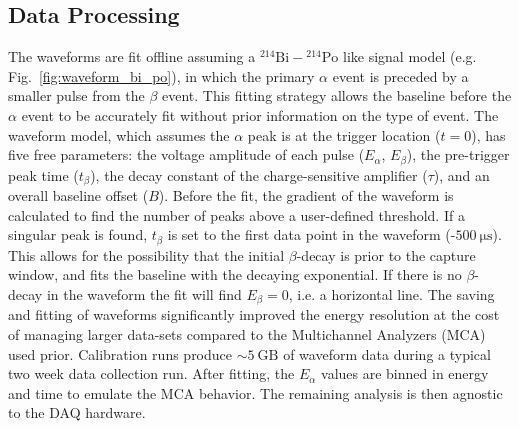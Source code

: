 \documentclass[final,3p,times]{elsarticle}
\begin{document}
\subsection{Data Processing}
The waveforms are fit offline assuming a $^{214}\text{Bi} - $$^{214}\mathrm{Po}$ like signal model (e.g. Fig.~\ref{fig:waveform_bi_po}), in which the primary $\alpha$ event is preceded by a smaller pulse from the $\beta$ event. 
This fitting strategy allows the baseline before the $\alpha$ event to be accurately fit without prior information on the type of event. 
The waveform model, which assumes the $\alpha$ peak is at the trigger location ($t=0$), has five free parameters: the voltage amplitude of each pulse ($E_\alpha$, $E_\beta$), the pre-trigger peak time ($t_\beta$), the decay constant of the charge-sensitive amplifier ($\tau$), and an overall baseline offset ($B$). 
Before the fit, the gradient of the waveform is calculated to find the number of peaks above a user-defined threshold. 
If a singular peak is found, $t_\beta$ is set to the first data point in the waveform (-$500~\mathrm{\mu s}$).
This allows for the possibility that the initial $\beta$-decay is prior to the capture window, and fits the baseline with the decaying exponential.
If there is no $\beta$-decay in the waveform the fit will find $E_\beta=0$, i.e. a horizontal line.
The saving and fitting of waveforms significantly improved the energy resolution at the cost of managing larger data-sets compared to the Multichannel Analyzers (MCA) used prior. 
Calibration runs produce $\sim 5~\text{GB}$ of waveform data during a typical two week data collection run.
After fitting, the $E_\alpha$ values are binned in energy and time to emulate the MCA behavior. 
The remaining analysis is then agnostic to the DAQ hardware.
\end{document}
